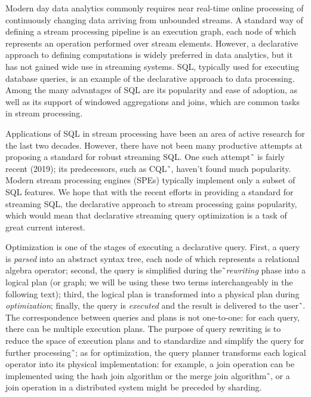 \label {fs-optimization-introduction}

Modern day data analytics commonly requires near real-time online processing of continuously changing data arriving from unbounded streams. A standard way of defining a stream processing pipeline is an execution graph, each node of which represents an operation performed over stream elements. However, a declarative approach to defining computations is widely preferred in data analytics, but it has not gained wide use in streaming systems. SQL, typically used for executing database queries, is an example of the declarative approach to data processing. Among the many advantages of SQL are its popularity and ease of adoption, as well as its support of windowed aggregations and joins, which are common tasks in stream processing. 

Applications of SQL in stream processing have been an area of active research for the last two decades. 
However, there have not been many productive attempts at proposing a standard for robust streaming SQL. 
One such attempt˜\cite{Begoli:2019:OSR:3299869.3314040} is fairly recent (2019); its predecessors, such as CQL˜\cite{Arasu:2006:CCQ:1146461.1146463}, haven't found much popularity.
 Modern stream processing engines (SPEs) typically implement only a subset of SQL features. We hope that with the recent efforts in providing a standard for streaming SQL, the declarative approach to stream processing gains popularity, which would mean that declarative streaming query optimization is a task of great current interest.

Optimization is one of the stages of executing a declarative query. 
First, a query is \textit{parsed} into an abstract syntax tree, each node of which represents a relational algebra operator; second, the query is simplified during the˜\textit{rewriting} phase into a logical plan (or graph; we will be using these two terms interchangeably in the following text); third, the logical plan is transformed into a physical plan during \textit{optimization}; finally, the query is \textit{executed} and the result is delivered to the user˜\cite{Pitoura2018processing}. 
The correspondence between queries and plans is not one-to-one: for each query, there can be multiple execution plans. 
The purpose of query rewriting is to reduce the space of execution plans and to standardize and simplify the query for further processing˜\cite{Pitoura2018rewriting}; as for optimization, the query planner transforms each logical operator into its physical implementation: for example, a join operation can be implemented using the hash join algorithm or the merge join algorithm˜\cite{Neumann2018optimization}, or a join operation in a distributed system might be preceded by sharding.  

